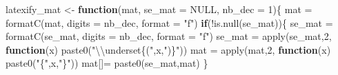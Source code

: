 \documentclass[
  11pt,
]{article}
\newenvironment{Shaded}{\begin{snugshade}}{\end{snugshade}}
\newcommand{\AttributeTok}[1]{\textcolor[rgb]{0.77,0.63,0.00}{#1}}
\newcommand{\ConstantTok}[1]{\textcolor[rgb]{0.00,0.00,0.00}{#1}}
\newcommand{\ControlFlowTok}[1]{\textcolor[rgb]{0.13,0.29,0.53}{\textbf{#1}}}
\newcommand{\DecValTok}[1]{\textcolor[rgb]{0.00,0.00,0.81}{#1}}
\newcommand{\FunctionTok}[1]{\textcolor[rgb]{0.00,0.00,0.00}{#1}}
\newcommand{\NormalTok}[1]{#1}
\newcommand{\OtherTok}[1]{\textcolor[rgb]{0.56,0.35,0.01}{#1}}
\newcommand{\SpecialCharTok}[1]{\textcolor[rgb]{0.00,0.00,0.00}{#1}}
\newcommand{\StringTok}[1]{\textcolor[rgb]{0.31,0.60,0.02}{#1}}
\begin{document}
\begin{Shaded}
\begin{Highlighting}[]
\NormalTok{latexify\_mat }\OtherTok{\textless{}{-}} \ControlFlowTok{function}\NormalTok{(mat, }\AttributeTok{se\_mat =} \ConstantTok{NULL}\NormalTok{, }\AttributeTok{nb\_dec =} \DecValTok{1}\NormalTok{)\{}
\NormalTok{    mat }\OtherTok{=} \FunctionTok{formatC}\NormalTok{(mat, }\AttributeTok{digits =}\NormalTok{ nb\_dec, }\AttributeTok{format =} \StringTok{"f"}\NormalTok{)}
    \ControlFlowTok{if}\NormalTok{(}\SpecialCharTok{!}\FunctionTok{is.null}\NormalTok{(se\_mat))\{}
\NormalTok{        se\_mat }\OtherTok{=} \FunctionTok{formatC}\NormalTok{(se\_mat, }\AttributeTok{digits =}\NormalTok{ nb\_dec, }\AttributeTok{format =} \StringTok{"f"}\NormalTok{)}
\NormalTok{        se\_mat }\OtherTok{=} \FunctionTok{apply}\NormalTok{(se\_mat,}\DecValTok{2}\NormalTok{,}
                       \ControlFlowTok{function}\NormalTok{(x) }\FunctionTok{paste0}\NormalTok{(}\StringTok{"}\SpecialCharTok{\textbackslash{}\textbackslash{}}\StringTok{underset\{("}\NormalTok{,x,}\StringTok{")\}"}\NormalTok{))}
\NormalTok{        mat }\OtherTok{=} \FunctionTok{apply}\NormalTok{(mat,}\DecValTok{2}\NormalTok{,}
                    \ControlFlowTok{function}\NormalTok{(x) }\FunctionTok{paste0}\NormalTok{(}\StringTok{"\{"}\NormalTok{,x,}\StringTok{"\}"}\NormalTok{))}
\NormalTok{        mat[]}\OtherTok{=} \FunctionTok{paste0}\NormalTok{(se\_mat,mat)}
\NormalTok{    \}}
    

\end{Highlighting}
\end{Shaded}
\end{document}
